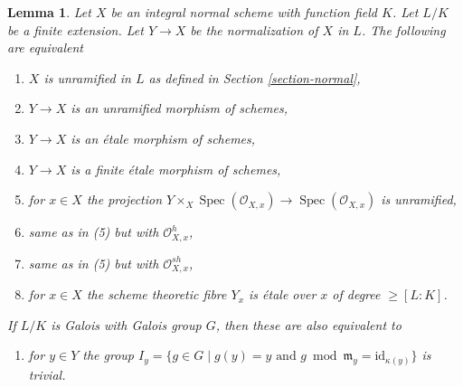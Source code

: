\documentclass{stacks-project}
\theoremstyle{plain}
\newtheorem{lemma}[subsection]{Lemma}
\theoremstyle{definition}
\theoremstyle{remark}
\numberwithin{equation}{subsection}
\def\Spec{\mathop{\mathrm{Spec}}}
\begin{document}
\begin{lemma}
\label{lemma-unramified}
Let $X$ be an integral normal scheme with function field $K$.
Let $L/K$ be a finite extension. Let $Y \to X$ be the normalization
of $X$ in $L$. The following are equivalent
\begin{enumerate}
\item $X$ is unramified in $L$ as defined in Section \ref{section-normal},
\item $Y \to X$ is an unramified morphism of schemes,
\item $Y \to X$ is an \'etale morphism of schemes,
\item $Y \to X$ is a finite \'etale morphism of schemes,
\item for $x \in X$ the projection
$Y \times_X \Spec(\mathcal{O}_{X, x}) \to \Spec(\mathcal{O}_{X, x})$
is unramified,
\item same as in (5) but with $\mathcal{O}_{X, x}^h$,
\item same as in (5) but with $\mathcal{O}_{X, x}^{sh}$,
\item for $x \in X$ the scheme theoretic fibre $Y_x$
is \'etale over $x$ of degree $\geq [L : K]$.
\end{enumerate}
If $L/K$ is Galois with Galois group $G$, then these are also
equivalent to
\begin{enumerate}
\item[(9)] for $y \in Y$ the group
$I_y = \{g \in G \mid g(y) = y\text{ and }
g \bmod \mathfrak m_y = \text{id}_{\kappa(y)}\}$ is trivial.
\end{enumerate}
\end{lemma}
\end{document}
